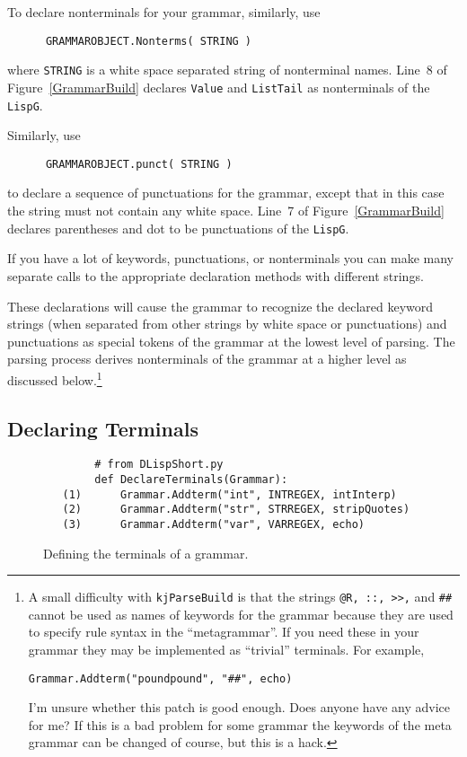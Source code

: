 To declare nonterminals for your grammar, similarly, use
\begin{verbatim}
      GRAMMAROBJECT.Nonterms( STRING )
\end{verbatim}
where {\tt STRING} is a white space separated string of nonterminal
names. Line~8 of Figure~\ref{GrammarBuild} declares {\tt Value}
and {\tt ListTail} as nonterminals of the {\tt LispG}.

Similarly, use
\begin{verbatim}
      GRAMMAROBJECT.punct( STRING )
\end{verbatim}
to declare a sequence of punctuations for the grammar, except
that in this case the string must not contain any white space.
Line~7 of Figure~\ref{GrammarBuild} declares parentheses and dot
to be punctuations of the {\tt LispG}.

If you have a lot of keywords, punctuations,
or nonterminals you can make many separate
calls to the appropriate declaration methods
with different strings.

These declarations will cause the grammar to recognize
the declared keyword strings (when separated from other
strings by white space or punctuations) and punctuations
as special tokens of the grammar at the lowest level of
parsing.  The parsing process derives nonterminals of the
grammar at a higher level as discussed 
below.\footnote{A small difficulty with
{\tt kjParseBuild} is that the strings {\tt @R, ::, >>,}
and {\tt \#\#} cannot be used as names of keywords for the
grammar because they are used to specify rule syntax
in the ``metagrammar''.  
If you need these in your grammar they may
be implemented as ``trivial'' terminals.  For example,
\begin{center}
  {\tt    Grammar.Addterm("poundpound", "\#\#", echo)}
\end{center}
I'm unsure whether this patch is good enough.
Does anyone have any advice for me?  If this is a bad
problem for some grammar the keywords of the meta grammar
can be changed of course, but this is a hack.}

\subsection{Declaring Terminals}

\begin{figure}
\begin{center}
\begin{verbatim}
        # from DLispShort.py
        def DeclareTerminals(Grammar):
   (1)      Grammar.Addterm("int", INTREGEX, intInterp)
   (2)      Grammar.Addterm("str", STRREGEX, stripQuotes)
   (3)      Grammar.Addterm("var", VARREGEX, echo)
\end{verbatim}
\end{center}
\caption{Defining the terminals of a grammar. \label{TermDef} }
\end{figure}

